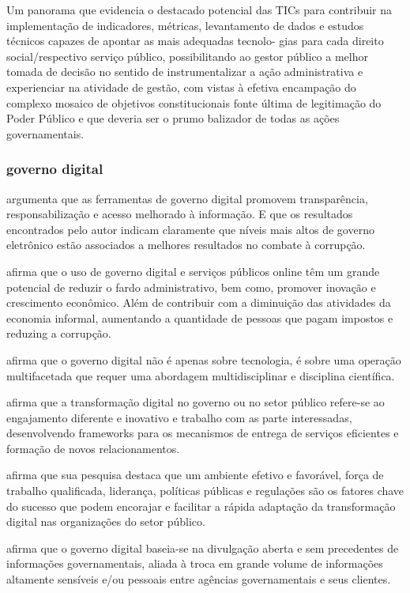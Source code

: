Um panorama que evidencia o destacado potencial das TICs para
contribuir na implementação de indicadores, métricas, levantamento de
dados e estudos técnicos capazes de apontar as mais adequadas tecnolo-
gias para cada direito social/respectivo serviço público, possibilitando ao
gestor público a melhor tomada de decisão no sentido de instrumentalizar
a ação administrativa e experienciar na atividade de gestão, com vistas à
efetiva encampação do complexo mosaico de objetivos constitucionais fonte última de legitimação do Poder Público e que deveria ser o prumo
balizador de todas as ações governamentais.



\subsubsection{governo digital}

\cite{martins2018war} argumenta que as ferramentas de governo digital promovem transparência, responsabilização e acesso melhorado à informação. E que os resultados encontrados pelo autor indicam claramente que níveis mais altos de governo eletrônico estão associados a melhores resultados no combate à corrupção.

\cite{veiga2016digital} afirma que o uso de governo digital e serviços públicos online têm um grande potencial de reduzir o fardo administrativo, bem como, promover inovação e crescimento econômico. Além de contribuir com a diminuição das atividades da economia informal, aumentando a quantidade de pessoas que pagam impostos e reduzing a corrupção.

\cite{veiga2016digital} afirma que o governo digital não é apenas sobre tecnologia, é sobre uma operação multifacetada  que requer uma abordagem multidisciplinar e disciplina científica.

\cite{alenezi2022understanding} afirma que a transformação digital no governo ou no setor público refere-se ao engajamento diferente e inovativo e trabalho com as parte interessadas, desenvolvendo frameworks para os mecanismos de entrega de serviços eficientes e formação de novos relacionamentos.

\cite{alenezi2022understanding} afirma que sua pesquisa destaca que um ambiente efetivo e favorável, força de trabalho qualificada, liderança, políticas públicas e regulações são os fatores chave do sucesso que podem encorajar e facilitar a rápida adaptação da transformação digital nas organizações do setor público.

\cite{bounabat2017government} afirma que o governo digital baseia-se na divulgação aberta e sem precedentes de informações governamentais, aliada à troca em grande volume de informações altamente sensíveis e/ou pessoais entre agências governamentais e seus clientes. 

